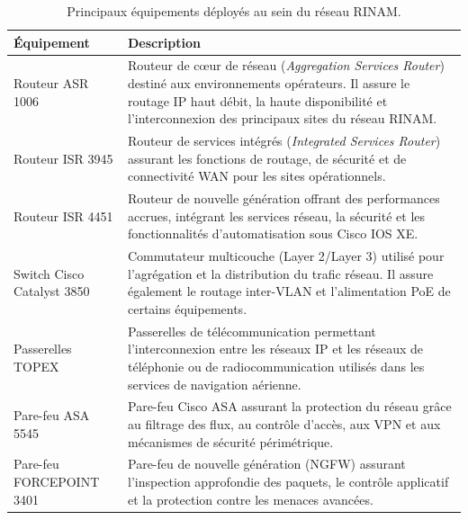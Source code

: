 \documentclass[12pt, a4paper, oneside]{report}
\begin{document}
\begin{table}[H]
  \centering
  \begin{tabularx}{\textwidth}{lX}
    \toprule
    \rowcolor{primary!40}
    \textbf{Équipement} & \textbf{Description} \\
    \midrule
    Routeur ASR 1006 &
    Routeur de cœur de réseau (\textit{Aggregation Services Router}) destiné 
    aux environnements opérateurs. Il assure le routage IP haut débit, 
    la haute disponibilité et l'interconnexion des principaux sites du réseau RINAM. \\

    Routeur ISR 3945 &
    Routeur de services intégrés (\textit{Integrated Services Router}) assurant 
    les fonctions de routage, de sécurité et de connectivité WAN pour les sites opérationnels. \\

    Routeur ISR 4451 &
    Routeur de nouvelle génération offrant des performances accrues, intégrant 
    les services réseau, la sécurité et les fonctionnalités d'automatisation sous Cisco IOS XE. \\

    Switch Cisco Catalyst 3850 &
    Commutateur multicouche (Layer 2/Layer 3) utilisé pour l'agrégation et la 
    distribution du trafic réseau. Il assure également le routage inter-VLAN et 
    l'alimentation PoE de certains équipements. \\

    Passerelles TOPEX &
    Passerelles de télécommunication permettant l'interconnexion entre les réseaux 
    IP et les réseaux de téléphonie ou de radiocommunication utilisés dans les services 
    de navigation aérienne. \\

    Pare-feu ASA 5545 &
    Pare-feu Cisco ASA assurant la protection du réseau grâce au filtrage des flux, 
    au contrôle d'accès, aux VPN et aux mécanismes de sécurité périmétrique. \\

    Pare-feu FORCEPOINT 3401 &
    Pare-feu de nouvelle génération (NGFW) assurant l'inspection approfondie des paquets, 
    le contrôle applicatif et la protection contre les menaces avancées. \\
    \bottomrule
  \end{tabularx}
  \caption{Principaux équipements déployés au sein du réseau RINAM.}
  \label{tab:equipements_cisco_rinam}
\end{table}
\end{document}

